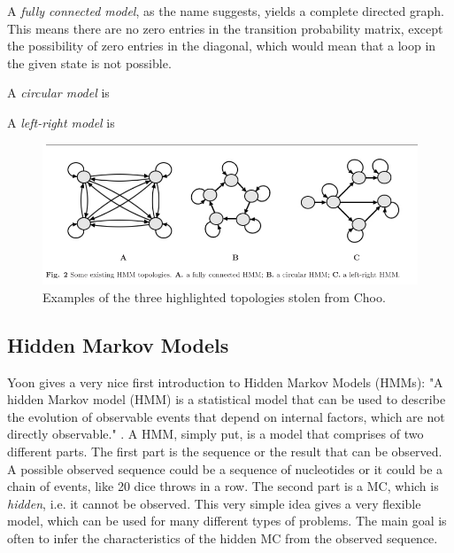 \documentclass{article}
\begin{document}
A \textit{fully connected model}, as the name suggests, yields a complete directed graph. This means there are no zero entries in the transition probability matrix, except the possibility of zero entries in the diagonal, which would mean that a loop in the given state is not possible. 

A \textit{circular model} is

A \textit{left-right model} is

\begin{figure}
    \centering
    \includegraphics[width = \textwidth]{ChooHMMTopologies.png}
    \caption{Examples of the three highlighted topologies stolen from Choo.}
    \label{fig:ChooTopologies}
\end{figure}

\subsection{Hidden Markov Models} \label{Section:HiddenMarkovModels}
Yoon gives a very nice first introduction to Hidden Markov Models (HMMs): "A hidden Markov model (HMM) is a statistical model that can be used to describe the evolution of observable events that depend on internal factors, which are not directly observable." \cite{Yoon2009}. A HMM, simply put, is a model that comprises of two different parts. The first part is the sequence or the result that can be observed. A possible observed sequence could be a sequence of nucleotides or it could be a chain of events, like 20 dice throws in a row. The second part is a MC, which is \textit{hidden}, i.e. it cannot be observed. This very simple idea gives a very flexible model, which can be used for many different types of problems. The main goal is often to infer the characteristics of the hidden MC from the observed sequence. 
\end{document}
